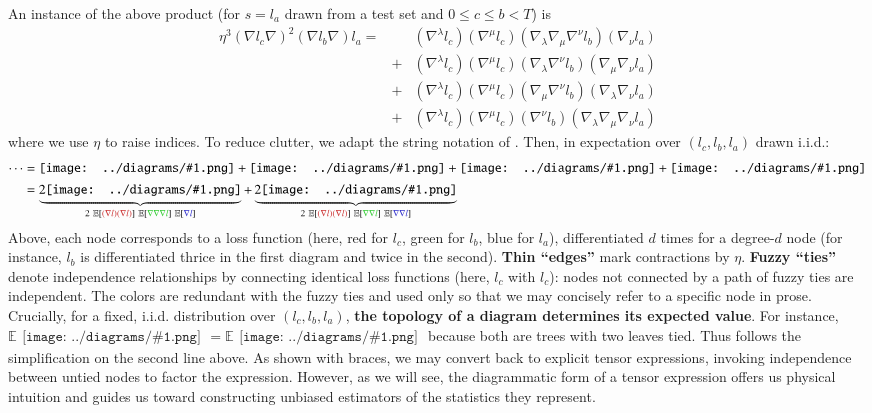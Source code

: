 \documentclass{article}
\newcommand{\expc}{\mathbb{E}}
\newcommand{\expct}[1]{\mathbb{E}\left[#1\right]}
\newcommand{\sdia}[1]{\begin{gathered}\texttt{[image: ../diagrams/\#1.png]}\end{gathered}}
\begin{document}
    An instance of the above product (for $s=l_a$ drawn from a test set and
    $0\leq c\leq b<T$) is \begin{align*}
        \eta^3 (\nabla l_c \nabla)^2 (\nabla l_b \nabla) l_a
        = & & (\nabla^\lambda l_c) (\nabla^\mu l_c) (\nabla_\lambda \nabla_\mu \nabla^\nu l_b) (\nabla_\nu l_a) \\
          &+& (\nabla^\lambda l_c) (\nabla^\mu l_c) (\nabla_\lambda \nabla^\nu l_b) (\nabla_\mu \nabla_\nu l_a) \\
          &+& (\nabla^\lambda l_c) (\nabla^\mu l_c) (\nabla_\mu \nabla^\nu l_b) (\nabla_\lambda \nabla_\nu l_a) \\
          &+& (\nabla^\lambda l_c) (\nabla^\mu l_c) (\nabla^\nu l_b) (\nabla_\lambda \nabla_\mu \nabla_\nu l_a)
    \end{align*}
    where we use $\eta$ to raise indices.  To reduce clutter, we adapt the
    string notation of \citet{pe71}.  Then, in expectation over $(l_c, l_b,
    l_a)$ drawn i.i.d.:
    \begin{align*}
        \cdots
        &= 
             \sdia{(01-2-3)(02-12-23)}
            +\sdia{(01-2-3)(02-13-23)}
            +\sdia{(01-2-3)(03-12-23)}
            +\sdia{(01-2-3)(03-13-23)} \\
        &=
            \underbrace{2\sdia{(01-2-3)(02-12-23)}}_{
                2~\expct{{\color{moor}(\nabla l)(\nabla l)}}~\expct{{\color{moog}\nabla\nabla\nabla l}}~\expct{{\color{moob} \nabla l}}
            }
            +
            \underbrace{2\sdia{(01-2-3)(02-13-23)}}_{
                2~\expct{{\color{moor}(\nabla l)(\nabla l)}}~\expct{{\color{moog}\nabla \nabla l}}~\expct{{\color{moob}\nabla \nabla l}}
            }
    \end{align*}
    Above, each node corresponds to a loss function (here, red for $l_c$, green
    for $l_b$, blue for $l_a$), differentiated $d$ times for a degree-$d$ node
    (for instance, $l_b$ is differentiated thrice in the first diagram and
    twice in the second).  {\bf Thin ``edges''} mark contractions by $\eta$.
    {\bf Fuzzy ``ties''} denote independence relationships by connecting
    identical loss functions (here, $l_c$ with $l_c$): nodes not connected by a
    path of fuzzy ties are independent.  The colors are redundant with the
    fuzzy ties and used only so that we may concisely refer to a specific node
    in prose.  Crucially, for a fixed, i.i.d. distribution over $(l_c, l_b,
    l_a)$, {\bf the topology of a diagram determines its expected value}.  For
    instance, $\expc \sdia{(01-2-3)(02-12-23)} = \expc
    \sdia{(01-2-3)(03-13-23)}$ because both are trees with two leaves tied.
    Thus follows the simplification on the second line above.  As shown with
    braces, we may convert back to explicit tensor expressions, invoking
    independence between untied nodes to factor the expression.  However, as we
    will see, the diagrammatic form of a tensor expression offers us physical
    intuition and guides us toward constructing unbiased estimators of the
    statistics they represent.  
    
\end{document}

